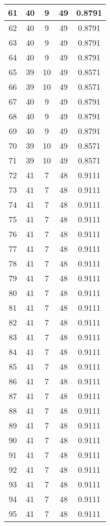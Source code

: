 \documentclass[letterpaper, 12pt]{article}
\begin{document}
\begin{longtable}{|c|c|c|c|c|}
\hline
61 & 40 & 9 & 49 & 0.8791 \\
\hline
62 & 40 & 9 & 49 & 0.8791 \\
\hline
63 & 40 & 9 & 49 & 0.8791 \\
\hline
64 & 40 & 9 & 49 & 0.8791 \\
\hline
65 & 39 & 10 & 49 & 0.8571 \\
\hline
66 & 39 & 10 & 49 & 0.8571 \\
\hline
67 & 40 & 9 & 49 & 0.8791 \\
\hline
68 & 40 & 9 & 49 & 0.8791 \\
\hline
69 & 40 & 9 & 49 & 0.8791 \\
\hline
70 & 39 & 10 & 49 & 0.8571 \\
\hline
71 & 39 & 10 & 49 & 0.8571 \\
\hline
72 & 41 & 7 & 48 & 0.9111 \\
\hline
73 & 41 & 7 & 48 & 0.9111 \\
\hline
74 & 41 & 7 & 48 & 0.9111 \\
\hline
75 & 41 & 7 & 48 & 0.9111 \\
\hline
76 & 41 & 7 & 48 & 0.9111 \\
\hline
77 & 41 & 7 & 48 & 0.9111 \\
\hline
78 & 41 & 7 & 48 & 0.9111 \\
\hline
79 & 41 & 7 & 48 & 0.9111 \\
\hline
80 & 41 & 7 & 48 & 0.9111 \\
\hline
81 & 41 & 7 & 48 & 0.9111 \\
\hline
82 & 41 & 7 & 48 & 0.9111 \\
\hline
83 & 41 & 7 & 48 & 0.9111 \\
\hline
84 & 41 & 7 & 48 & 0.9111 \\
\hline
85 & 41 & 7 & 48 & 0.9111 \\
\hline
86 & 41 & 7 & 48 & 0.9111 \\
\hline
87 & 41 & 7 & 48 & 0.9111 \\
\hline
88 & 41 & 7 & 48 & 0.9111 \\
\hline
89 & 41 & 7 & 48 & 0.9111 \\
\hline
90 & 41 & 7 & 48 & 0.9111 \\
\hline
91 & 41 & 7 & 48 & 0.9111 \\
\hline
92 & 41 & 7 & 48 & 0.9111 \\
\hline
93 & 41 & 7 & 48 & 0.9111 \\
\hline
94 & 41 & 7 & 48 & 0.9111 \\
\hline
95 & 41 & 7 & 48 & 0.9111 \\

\end{longtable}
\end{document}
